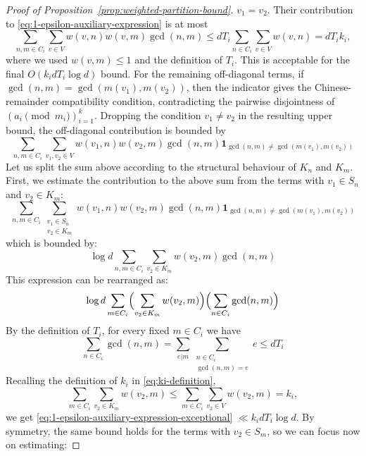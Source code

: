 \documentclass[11pt]{amsart}
\theoremstyle{remark}
\begin{document}
\begin{proof}[Proof of Proposition~\ref{prop:weighted-partition-bound}]
  $v_1=v_2$. Their contribution
  to \eqref{eq:1-epsilon-auxiliary-expression} is at most
  \[
    \sum_{n,m\in C_i}\sum_{v\in V}w(v,n)w(v,m)\gcd(n,m)
    \leq dT_i\sum_{n\in C_i}\sum_{v\in V}w(v,n)=dT_i k_i,
  \]
  where we used $w(v,m)\leq 1$ and the definition of $T_i$. This is acceptable for the final $O(k_idT_i\log d)$ bound. For the remaining off-diagonal terms, if $\gcd(n,m)=\gcd(m(v_1),m(v_2))$, then the indicator gives the Chinese-remainder compatibility condition, contradicting the pairwise disjointness of $(a_i \pmod{m_i})_{i=1}^k$. Dropping the condition $v_1\neq v_2$ in the resulting upper bound, the off-diagonal contribution is bounded by
  \begin{equation}
    \sum_{n, m \in C_i} \sum_{v_1, v_2 \in V} w(v_1, n) w(v_2, m) \gcd(n, m) \mathbf{1}_{\gcd(n,m) \neq \gcd(m(v_1), m(v_2))}
  \end{equation}
  Let us split the sum above according to the structural behaviour of $K_n$ and $K_m$. First, we estimate the contribution to the above sum from the terms with $v_1\in S_n$ and $v_2\in K_m$:
  \begin{equation} \label{eq:1-epsilon-auxiliary-expression-exceptional}
    \sum_{n, m \in C_i} \sum_{\substack{v_1 \in S_n \\ v_2 \in K_m}}w(v_1, n) w(v_2, m) \gcd(n, m) \mathbf{1}_{\gcd(n,m) \neq \gcd(m(v_1), m(v_2))}
  \end{equation}
  which is bounded by:
  \begin{equation}
    \log d \sum_{n, m \in C_i} \sum_{v_2 \in K_m} w(v_2, m) \gcd(n, m)
  \end{equation}
  This expression can be rearranged as:
  \begin{equation}
    \log d \sum_{m \in C_i} \Bigl( \sum_{v_2 \in K_m} w(v_2, m) \Bigr) \Bigl( \sum_{n \in C_i}  \gcd(n, m) \Bigr)
  \end{equation}
  By the definition of $T_i$, for every fixed $m\in C_i$ we have
  \begin{equation}
    \sum_{n \in C_i} \gcd(n, m) = \sum_{e | m} \sum_{\substack{n \in C_i \\ \gcd(n, m) = e}} e \leq dT_i
  \end{equation}
  Recalling the definition of $k_i$ in \eqref{eq:ki-definition},
  \[
    \sum_{m \in C_i}\sum_{v_2\in K_m}w(v_2,m)\leq \sum_{m \in C_i}\sum_{v_2\in V}w(v_2,m)=k_i,
  \]
  we get \eqref{eq:1-epsilon-auxiliary-expression-exceptional} $\ll k_idT_i\log d$. By symmetry, the same bound holds for the terms with $v_2\in S_m$, so we can focus now on estimating:

\end{proof}
\end{document}

